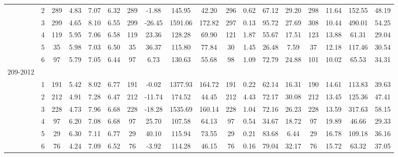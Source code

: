 \begin{sidewaystable}[h]
\begin{tabular}{p{.5cm}ccccccccccccccccc}
                    & 2         & 289 & 4.83      & 7.07        & 6.32         & 289 & -1.88      & 145.95    & 42.20      & 296 & 0.62       & 67.12       & 29.20           & 298 & 11.64      & 152.55   & 48.19  \\ 
                    & 3         & 299 & 4.65      & 8.10        & 6.55         & 299 & -26.45    & 1591.06  & 172.82   & 297 & 0.13       & 95.72       & 27.69            & 308 & 10.44      & 490.01   & 54.25  \\ 
                    & 4         & 119 & 5.95      & 7.06        & 6.58         & 119 & 23.36     & 128.28    & 69.90      & 121 & 1.87       & 55.67       & 17.51           & 123 & 13.88      & 61.31     & 29.04  \\ 
                    & 5         & 35   & 5.98      & 7.03        & 6.50         & 35   & 36.37     & 115.80    & 77.84      & 30   & 1.45       & 26.48       & 7.59             & 37   & 12.18       & 117.46   & 30.54  \\ 
                    & 6         & 97   & 5.79      & 7.05        & 6.44         & 97   & 6.73       & 130.63    & 55.68      & 98   & 1.09       & 72.79       & 24.88          & 101 & 10.02       & 65.53     & 34.31  \\ 
 209-2012 \\
                   & 1         & 191  & 5.42     & 8.02        & 6.77         & 191 & -0.02      & 1377.93   & 164.72    & 191 & 0.22       & 62.14      & 16.31           & 190 & 14.61      & 113.83    & 39.63  \\ 
                   & 2         & 212  & 4.91     & 7.28        & 6.47         & 212 & -11.74    & 174.52     & 44.45      & 212 & 4.43       & 72.17      & 30.08           & 212 & 13.45      & 125.36    & 47.41  \\ 
                   & 3         & 228  & 4.73     & 7.96        & 6.68         & 228 & -18.28    & 1535.69   & 160.14    & 228 & 1.04       & 72.16      & 26.23           & 228 & 13.59      & 317.63    & 58.15  \\ 
                   &4          & 97    & 6.20     & 7.08        & 6.68         & 97   & 25.70     & 107.58      & 64.13     & 97   & 0.54        & 34.67      & 18.72           & 97   & 19.89      & 46.66     & 29.33  \\ 
                   & 5         & 29    & 6.30     & 7.11        & 6.77         & 29   & 40.10     & 115.94     & 73.55      & 29   & 0.21       & 83.68       & 6.44            & 29   & 16.78       & 109.18   & 36.16  \\ 
                   &6          & 76    & 4.24     & 7.09        & 6.52         & 76   & -3.92      & 114.28     & 46.15     & 76    & 0.16       & 79.04      & 32.17           & 76   & 15.72       & 63.32    & 37.05  \\ 
 \bottomrule
\end{tabular}
\label{tab:Descriptive Statistics}
\end{sidewaystable}